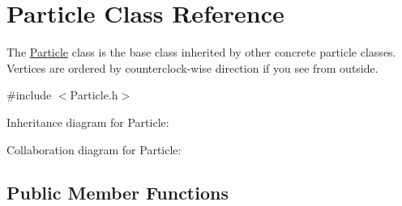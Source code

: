 \hypertarget{class_particle}{}\section{Particle Class Reference}
\label{class_particle}


The \mbox{\hyperlink{class_particle}{Particle}} class is the base class inherited by other concrete particle classes. Vertices are ordered by counterclock-\/wise direction if you see from outside.  




{\ttfamily \#include $<$Particle.\+h$>$}



Inheritance diagram for Particle\+:


Collaboration diagram for Particle\+:
\subsection*{Public Member Functions}
